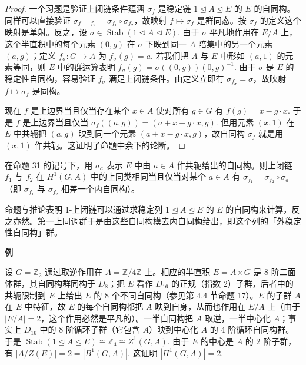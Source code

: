 \begin{proof}
一个习题是验证上闭链条件蕴涵 \(\sigma_f\) 是稳定链 \(1 \trianglelefteq A \trianglelefteq E\) 的 \(E\) 的自同构。同样可以直接验证 \(\sigma_{f_1+f_2} = \sigma_{f_1} \circ \sigma_{f_2}\)，故映射 \(f \mapsto \sigma_f\) 是群同态。按 \(\sigma_f\) 的定义这个映射是单射。反之，设 \(\sigma \in \operatorname{Stab}(1 \trianglelefteq A \trianglelefteq E)\). 由于 \(\sigma\) 平凡地作用在 \(E/A\) 上，这个半直积中的每个元素 \((0, g)\) 在 \(\sigma\) 下映到同一 \(A\)-陪集中的另一个元素 \((a, g)\)；定义 \(f_\sigma : G \to A\) 为 \(f_\sigma(g) = a\). 若我们把 \(A\) 与 \(E\) 中形如 \((a, 1)\) 的元素等同，则 \(E\) 中的群运算表明 \(f_\sigma(g) = \sigma((0,g))(0,g)^{-1}\). 由于 \(\sigma\) 是 \(E\) 的稳定性自同构，容易验证 \(f_\sigma\) 满足上闭链条件。由定义立即有 \(\sigma_{f_\sigma} = \sigma\)，故映射 \(f \mapsto \sigma_f\) 是同构。

现在 \(f\) 是上边界当且仅当存在某个 \(x \in A\) 使对所有 \(g \in G\) 有 \(f(g) = x-g \cdot x\). 于是 \(f\) 是上边界当且仅当 \(\sigma_f((a,g)) = (a+x-g \cdot x, g)\). 但用元素 \((x,1)\) 在 \(E\) 中共轭把 \((a,g)\) 映到同一个元素 \((a+x-g \cdot x, g)\)，故自同构 \(\sigma_f\) 就是用 \((x,1)\) 作共轭。这证明了命题中余下的论断。
\end{proof}

\begin{corollary}\label{cor:17.32}
在命题 31 的记号下，用 \(\sigma_a\) 表示 \(E\) 中由 \(a \in A\) 作共轭给出的自同构。则上闭链 \(f_1\) 与 \(f_2\) 在 \(H^1(G, A)\) 中的上同类相同当且仅当对某个 \(a \in A\) 有 \(\sigma_{f_1} = \sigma_{f_2} \circ \sigma_a\)（即 \(\sigma_{f_1}\) 与 \(\sigma_{f_2}\) 相差一个内自同构）。
\end{corollary}

命题与推论表明 1-上闭链可以通过求稳定列 \(1 \trianglelefteq A \trianglelefteq E\) 的 \(E\) 的自同构来计算，反之亦然。第一上同调群于是由这些自同构模去内自同构给出，即这个列的「外稳定性自同构」群。

\noindent\textbf{例}

设 \(G = \mathbb{Z}_2\) 通过取逆作用在 \(A = \mathbb{Z}/4\mathbb{Z}\) 上。相应的半直积 \(E = A \rtimes G\) 是 8 阶二面体群，其自同构群同构于 \(D_8\)；把 \(E\) 看作 \(D_{16}\) 的正规（指数 2）子群，后者中的共轭限制到 \(E\) 上给出 \(E\) 的 8 个不同自同构（参见第 4.4 节命题 17）。\(E\) 的子群 \(A\) 在 \(E\) 中特征，故 \(E\) 的每个自同构都把 \(A\) 映到自身，从而也作用在 \(E/A\) 上（由于 \(|E/A| = 2\)，这个作用必然是平凡的）。一半自同构把 \(A\) 取逆，一半中心化 \(A\)；事实上 \(D_{16}\) 中的 8 阶循环子群（它包含 \(A\)）映到中心化 \(A\) 的 4 阶循环自同构群。于是 \(\operatorname{Stab}(1 \trianglelefteq A \trianglelefteq E) \cong \mathbb{Z}_4 \cong Z^1(G, A)\). 由于 \(E\) 的中心是 \(A\) 的 2 阶子群，有 \(|A/Z(E)| = 2 = |B^1(G, A)|\). 这证明 \(|H^1(G, A)| = 2\).


